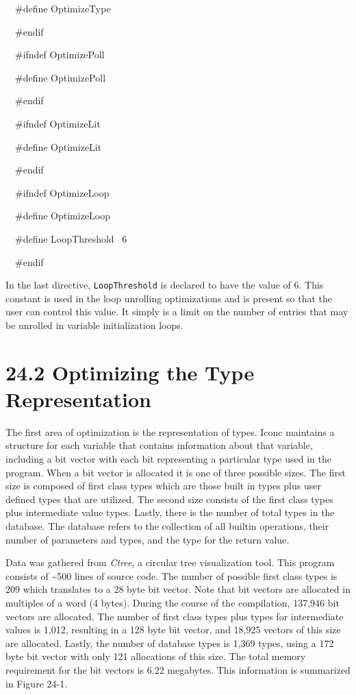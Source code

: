 {\ttfamily\mdseries
\ \ \#define OptimizeType}

{\ttfamily\mdseries
\ \ \#endif}


\bigskip

{\ttfamily\mdseries
\ \ \#ifndef OptimizePoll}

{\ttfamily\mdseries
\ \ \#define OptimizePoll}

{\ttfamily\mdseries
\ \ \#endif}


\bigskip

{\ttfamily\mdseries
\ \ \#ifndef OptimizeLit}

{\ttfamily\mdseries
\ \ \#define OptimizeLit}

{\ttfamily\mdseries
\ \ \#endif}


\bigskip

{\ttfamily\mdseries
\ \ \#ifndef OptimizeLoop}

{\ttfamily\mdseries
\ \ \#define OptimizeLoop}

{\ttfamily\mdseries
\ \ \#define LoopThreshold \ 6}

{\ttfamily\mdseries
\ \ \#endif}


In the last directive, \texttt{LoopThreshold} is declared to have the
value of 6. This constant is used in the loop unrolling optimizations
and is present so that the user can control this value. It simply is a
limit on the number of entries that may be unrolled in variable
initialization loops.


\section[24.2 Optimizing the Type Representation]{24.2 Optimizing the Type Representation}

The first area of optimization is the representation of types. Iconc
maintains a structure for each variable that contains information
about that variable, including a bit vector with each bit representing
a particular type used in the program. When a bit vector is allocated
it is one of three possible sizes. The first size is composed of first
class types which are those built in types plus user defined types
that are utilized. The second size consists of the first class types
plus intermediate value types. Lastly, there is the number of total
types in the database. The database refers to the collection of all
builtin operations, their number of parameters and types, and the type
for the return value.

Data was gathered from \textit{Ctree}, a circular tree visualization
tool. This program consists of \~{}500 lines of source code. The
number of possible first class types is 209 which translates to a 28
byte bit vector. Note that bit vectors are allocated in multiples of a
word (4 bytes). During the course of the compilation, 137,946 bit
vectors are allocated. The number of first class types plus types for
intermediate values is 1,012, resulting in a 128 byte bit vector, and
18,925 vectors of this size are allocated. Lastly, the number of
database types is 1,369 types, using a 172 byte bit vector with only
121 allocations of this size. The total memory requirement for the bit
vectors is 6.22 megabytes. This information is summarized in Figure
24-1.

